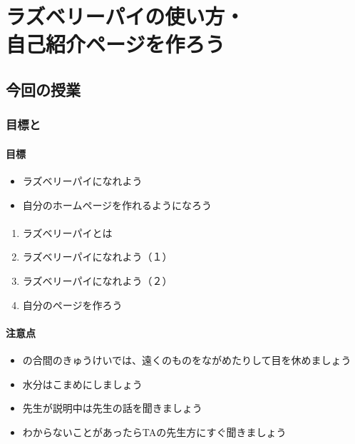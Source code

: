 %
% 
\chapter{ラズベリーパイの使い方・\\自己紹介ページを作ろう}

% 
% 
\section{今回の授業}

% 
% 
\subsection{目標と}

% 
% 
\subsubsection{目標}

\begin{itemize}
  \item ラズベリーパイになれよう
  \item 自分のホームページを作れるようになろう
\end{itemize}

% 
% 
\subsubsection{}

\begin{enumerate}
  \item ラズベリーパイとは
  \item ラズベリーパイになれよう（１）
  \item ラズベリーパイになれよう（２）
  \item 自分のページを作ろう
\end{enumerate}

% 
% 
\subsubsection{注意点}

\begin{itemize}
  \item {}の合間のきゅうけいでは、遠くのものをながめたりして目を休めましょう
  \item 水分はこまめにしましょう
  \item 先生が説明中は先生の話を聞きましょう
  \item わからないことがあったらTAの先生方にすぐ聞きましょう
\end{itemize}

